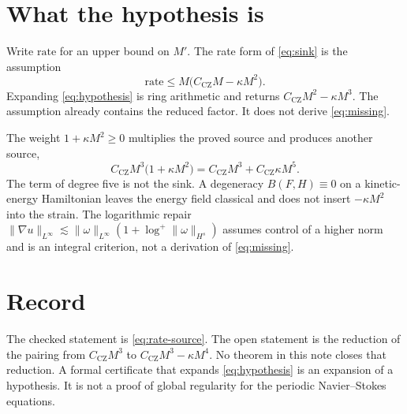 \documentclass[11pt]{article}
\theoremstyle{definition}
\theoremstyle{remark}
\begin{document}
\section{What the hypothesis is}
Write $\mathrm{rate}$ for an upper bound on $M'$. The rate form of \eqref{eq:sink} is the assumption
\begin{equation}
\label{eq:hypothesis}
\mathrm{rate}\le M\bigl(C_{\mathrm{CZ}} M-\kappa M^2\bigr).
\end{equation}
Expanding \eqref{eq:hypothesis} is ring arithmetic and returns $C_{\mathrm{CZ}} M^2-\kappa M^3$. The assumption already contains the reduced factor. It does not derive \eqref{eq:missing}.

The weight $1+\kappa M^2\ge 0$ multiplies the proved source and produces another source,
\[
C_{\mathrm{CZ}} M^3\bigl(1+\kappa M^2\bigr)=C_{\mathrm{CZ}} M^3+C_{\mathrm{CZ}}\kappa M^5.
\]
The term of degree five is not the sink. A degeneracy $B(F,H)\equiv 0$ on a kinetic-energy Hamiltonian leaves the energy field classical and does not insert $-\kappa M^2$ into the strain. The logarithmic repair $\|\nabla u\|_{L^\infty}\lesssim\|\omega\|_{L^\infty}(1+\log^+\|\omega\|_{H^s})$ assumes control of a higher norm and is an integral criterion, not a derivation of \eqref{eq:missing}.

\section{Record}
The checked statement is \eqref{eq:rate-source}. The open statement is the reduction of the pairing from $C_{\mathrm{CZ}} M^3$ to $C_{\mathrm{CZ}} M^3-\kappa M^4$. No theorem in this note closes that reduction. A formal certificate that expands \eqref{eq:hypothesis} is an expansion of a hypothesis. It is not a proof of global regularity for the periodic Navier--Stokes equations.
\end{document}
